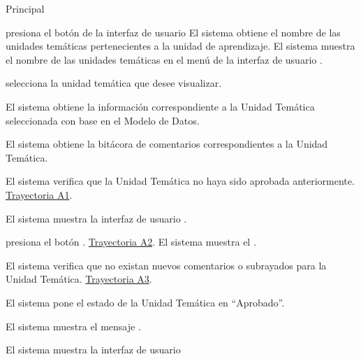 \begin{UCtrayectoria}{Principal}

    \UCpaso[\UCactor] presiona el botón   de la interfaz de usuario 
	\UCpaso El sistema obtiene el nombre de las unidades temáticas pertenecientes a la unidad de aprendizaje.
	\UCpaso El sistema muestra el nombre de las unidades temáticas en el menú de la interfaz  de usuario .

    \UCpaso[\UCactor] selecciona la unidad temática que desee visualizar.
     
         \UCpaso El sistema obtiene la información correspondiente a la Unidad Temática seleccionada con base en el Modelo de Datos.
         
    \UCpaso El sistema obtiene la bitácora de comentarios correspondientes a la Unidad Temática. 
    
    \UCpaso El sistema verifica que la Unidad Temática   no haya sido aprobada anteriormente.  \hyperlink{SP2-CU10-A1}{Trayectoria A1}. 
    
    \UCpaso El sistema muestra la interfaz de usuario  . 
    
    \UCpaso[\UCactor] presiona el botón . \hyperlink{SP2-CU10-A2}{Trayectoria A2}.
    \UCpaso El sistema muestra el .
    
    \UCpaso	El sistema verifica que no existan nuevos comentarios o subrayados para la Unidad Temática.  \hyperlink{SP2-CU10-A3}{Trayectoria A3}. 
    
    \UCpaso El sistema pone el estado de la Unidad Temática en “Aprobado”.
    
    \UCpaso El sistema muestra el mensaje .

    \UCpaso El sistema muestra la interfaz de usuario 

\end{UCtrayectoria}



